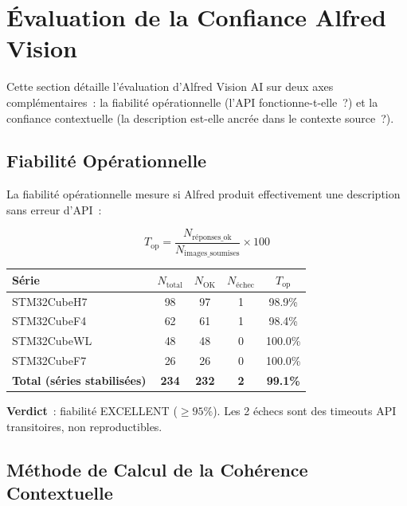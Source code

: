 \section{Évaluation de la Confiance Alfred Vision}
\label{sec:eval_alfred_complete}

Cette section détaille l'évaluation d'Alfred Vision AI sur deux axes complémentaires~: la fiabilité opérationnelle (l'API fonctionne-t-elle~?) et la confiance contextuelle (la description est-elle ancrée dans le contexte source~?).

\subsection{Fiabilité Opérationnelle}
\label{sec:alfred_fiabilite}

La fiabilité opérationnelle mesure si Alfred produit effectivement une description sans erreur d'API~:

\begin{equation}
T_{\text{op}} = \frac{N_{\text{réponses\_ok}}}{N_{\text{images\_soumises}}} \times 100
\label{eq:alfred_fiabilite_op}
\end{equation}

\begin{longtable}{lcccc}
\toprule
\textbf{Série} & $N_{\text{total}}$ & $N_{\text{OK}}$ & $N_{\text{échec}}$ & $T_{\text{op}}$ \\
\midrule
STM32CubeH7 & 98 & 97 & 1 & 98.9\% \\
STM32CubeF4 & 62 & 61 & 1 & 98.4\% \\
STM32CubeWL & 48 & 48 & 0 & 100.0\% \\
STM32CubeF7 & 26 & 26 & 0 & 100.0\% \\
\midrule
\textbf{Total (séries stabilisées)} & \textbf{234} & \textbf{232} & \textbf{2} & \textbf{99.1\%} \\
\bottomrule
\end{longtable}

\textbf{Verdict}~: fiabilité EXCELLENT ($\geq 95\%$). Les 2 échecs sont des timeouts API transitoires, non reproductibles.

\subsection{Méthode de Calcul de la Cohérence Contextuelle}
\label{sec:alfred_methode_coherence}

